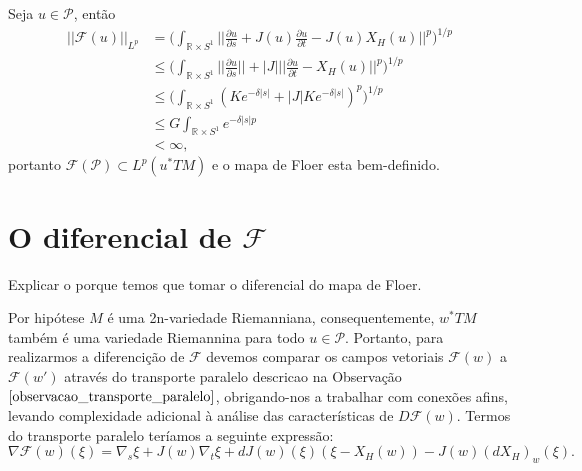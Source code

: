 \documentclass[12pt]{book}
\newcommand{\caminhosexponenciaisconectantesabrev}{\mathcal{P}}
\newcommand{\circulo}{S^{1}}
\newcommand{\derivadaparcial}[2]{\frac{\partial #1}{\partial #2}}
\newcommand{\mapafloer}{\mathcal{F}}
\newcommand{\mapafloerdefinicao}[1]{\derivadaparcial{#1}{s} + J(#1)\derivadaparcial{#1}{t} - J(#1)X_{H}(#1)}
\newcommand{\mapafloerparametro}[1]{\mathcal{F}(#1)}
\newcommand{\mapafloerpadrao}{\mapafloerparametro{u}}
\newcommand{\normagrande}[1]{\Big|\Big|#1\Big|\Big|}
\newcommand{\normaLp}[1]{||#1||_{L^{p}}}
\newcommand{\normaLpdefinicao}[2]{ \Big(\int_{#2}#1^{p}\Big)^{1/p}}
\newcommand{\normagrandeLpdefinicao}[2]{ \normaLpdefinicao{\normagrande{#1}}{#2}}
\newcommand{\pullbackfibradotangente}[2]{#1^{*}T#2}
\newcommand{\pullbackfibradotangenteM}[1]{\pullbackfibradotangente{#1}{M}}
\newcommand{\pullbackfibradotangenteMpadrao}{\pullbackfibradotangente{u}{M}}
\newcommand{\retacartesianocirculo}{\real{} \times \circulo}
\newcommand{\real}[1]{\mathbb{R}^{#1}}
\newcommand{\vermelho}[1]{{\color{red}#1}}
\begin{document}
	Seja $u \in \caminhosexponenciaisconectantesabrev$, então
	$$
	\begin{aligned}
	\normaLp{\mapafloerpadrao} &= \normagrandeLpdefinicao{\mapafloerdefinicao{u}}{\retacartesianocirculo}
	\\
	&\leq \normaLpdefinicao{\normagrande{\derivadaparcial{u}{s}} +|J|\normagrande{\derivadaparcial{u}{t} - X_{H}(u)}}{\retacartesianocirculo}
	\\
	&\leq \normaLpdefinicao{(Ke^{-\delta|s|} +|J|Ke^{-\delta|s|})}{\retacartesianocirculo}
	\\
	&\leq G \int_{\retacartesianocirculo}e^{-\delta|s|p}
	\\
	&< \infty,
	\end{aligned}	
	$$ 
	portanto $\mapafloerparametro{\caminhosexponenciaisconectantesabrev} \subset L^{p}(\pullbackfibradotangenteMpadrao)$ e o mapa de Floer esta bem-definido.
	
	\section{O diferencial de $\mapafloer$}
	\vermelho{Explicar o porque temos que tomar o diferencial do mapa de Floer.}
	
	
	
	Por hipótese $M$ é uma 2n-variedade Riemanniana, consequentemente, $\pullbackfibradotangenteM{w}$ também é uma variedade Riemannina para todo $u \in \caminhosexponenciaisconectantesabrev$. Portanto, para realizarmos a diferencição de $\mapafloer$ devemos comparar os campos vetoriais $\mapafloerparametro{w}$ a $\mapafloerparametro{w'}$ através do transporte paralelo descricao na Observação $\ref{observacao_transporte_paralelo}$, obrigando-nos a trabalhar com conexões afins, levando complexidade adicional à análise das características de $D\mapafloer(w)$. Termos do transporte paralelo teríamos a seguinte expressão:
	$$
	\nabla\mapafloerparametro{w}(\xi) = \nabla_{s}\xi + J(w)\nabla_{t}\xi + dJ(w)(\xi)(\xi - X_{H}(w)) - J(w)(dX_{H})_{w}(\xi).
	$$ 
	
\end{document}
